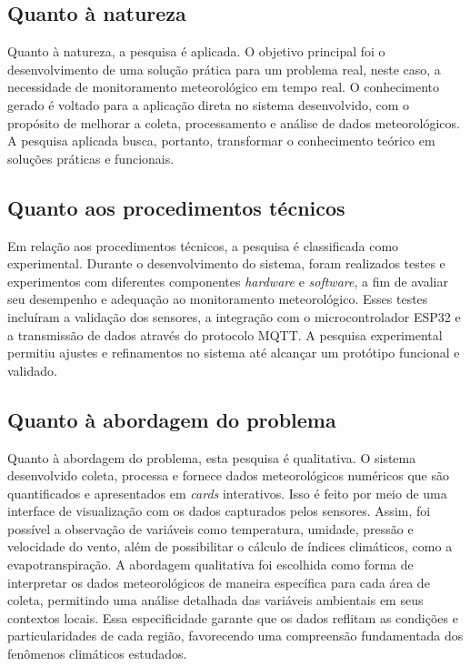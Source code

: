 \subsection{Quanto à natureza}

Quanto à natureza, a pesquisa é aplicada. O objetivo principal foi o desenvolvimento de uma solução prática para um problema real, neste caso, a necessidade de monitoramento meteorológico em tempo real. O conhecimento gerado é voltado para a aplicação direta no sistema desenvolvido, com o propósito de melhorar a coleta, processamento e análise de dados meteorológicos. A pesquisa aplicada busca, portanto, transformar o conhecimento teórico em soluções práticas e funcionais.

\subsection{Quanto aos procedimentos técnicos}

Em relação aos procedimentos técnicos, a pesquisa é classificada como experimental. Durante o desenvolvimento do sistema, foram realizados testes e experimentos com diferentes componentes \textit{hardware} e \textit{software}, a fim de avaliar seu desempenho e adequação ao monitoramento meteorológico. Esses testes incluíram a validação dos sensores, a integração com o microcontrolador ESP32 e a transmissão de dados através do protocolo MQTT. A pesquisa experimental permitiu ajustes e refinamentos no sistema até alcançar um protótipo funcional e validado.

\subsection{Quanto à abordagem do problema}

Quanto à abordagem do problema, esta pesquisa é qualitativa. O sistema desenvolvido coleta, processa e fornece dados meteorológicos numéricos que são quantificados e apresentados em \textit{cards} interativos. Isso é feito por meio de uma interface de visualização com os dados capturados pelos sensores. Assim, foi possível a observação de variáveis como temperatura, umidade, pressão e velocidade do vento, além de possibilitar o cálculo de índices climáticos, como a evapotranspiração. A abordagem qualitativa foi escolhida como forma de interpretar os dados meteorológicos de maneira específica para cada área de coleta, permitindo uma análise detalhada das variáveis ambientais em seus contextos locais. Essa especificidade garante que os dados reflitam as condições e particularidades de cada região, favorecendo uma compreensão fundamentada dos fenômenos climáticos estudados.

